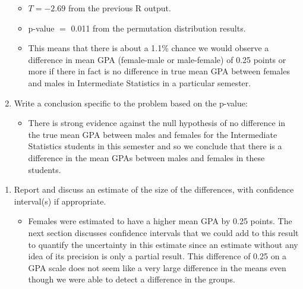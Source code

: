 \documentclass[
]{book}
\providecommand{\tightlist}{%
  \setlength{\itemsep}{0pt}\setlength{\parskip}{0pt}}
\begin{document}
\begin{enumerate}
  \begin{itemize}
  \item
    \(T = -2.69\) from the previous R output.
  \item
    p-value \(=\) 0.011 from the permutation distribution results.
  \item
    This means that there is about a 1.1\% chance we would observe
    a difference in mean GPA (female-male or male-female) of 0.25 points or more
    if there in fact is no difference in true mean GPA between females and males
    in Intermediate Statistics in a particular semester.
  \end{itemize}
\item
  Write a conclusion specific to the problem based on the p-value:

  \begin{itemize}
  \tightlist
  \item
    There is strong evidence against the null hypothesis of no difference
    in the true mean GPA between males and females for the Intermediate Statistics students
    in this semester and so we conclude that there is a difference
    in the mean GPAs between males and females in these students.
  \end{itemize}
\end{enumerate}

\begin{enumerate}
\def\labelenumi{\arabic{enumi}.}
\setcounter{enumi}{4}
\item
  Report and discuss an estimate of the size of the differences, with confidence interval(s) if appropriate. 

  \begin{itemize}
  \tightlist
  \item
    Females were estimated to have a higher mean GPA by 0.25 points. The next
    section discusses confidence intervals that we could add to this result to
    quantify the uncertainty in this estimate since an estimate without any idea of its precision is only a partial result. This difference of 0.25 on a GPA scale does not seem like a very large difference in the means even though we were able to detect a difference in the groups.
  \end{itemize}
\end{enumerate}
\end{document}
